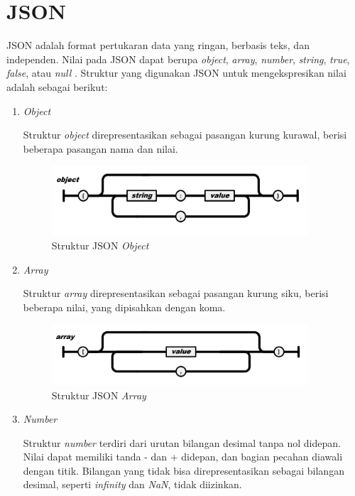 \section{JSON}
\par JSON adalah format pertukaran data yang ringan, berbasis teks, dan independen. Nilai pada JSON dapat berupa \textit{object}, \textit{array}, \textit{number}, \textit{string}, \textit{true}, \textit{false}, atau \textit{null} \cite{json-online}. Struktur yang digunakan JSON untuk mengekspresikan nilai adalah sebagai berikut:
\begin{enumerate}[listparindent=2.5em]
	\item \textit{Object}
	\par Struktur \textit{object} direpresentasikan sebagai pasangan kurung kurawal, berisi beberapa pasangan nama dan nilai.
	\begin{figure}[H]
		\centering\includegraphics[width=0.9\textwidth]{bab2/img/json_object.jpg}
		\caption{Struktur JSON \textit{Object}}
	\end{figure}
	\item \textit{Array}
	\par Struktur \textit{array} direpresentasikan sebagai pasangan kurung siku, berisi beberapa nilai, yang dipisahkan dengan koma.
	\clearpage
	\begin{figure}[H]
		\centering\includegraphics[width=0.9\textwidth]{bab2/img/json_array.jpg}
		\caption{Struktur JSON \textit{Array}}
	\end{figure}
	\item \textit{Number}
	\par Struktur \textit{number} terdiri dari urutan bilangan desimal tanpa nol didepan. Nilai dapat memiliki tanda - dan + didepan, dan bagian pecahan diawali dengan titik. Bilangan yang tidak bisa direpresentasikan sebagai bilangan desimal, seperti \textit{infinity} dan \textit{NaN}, tidak diizinkan.

\end{enumerate}
